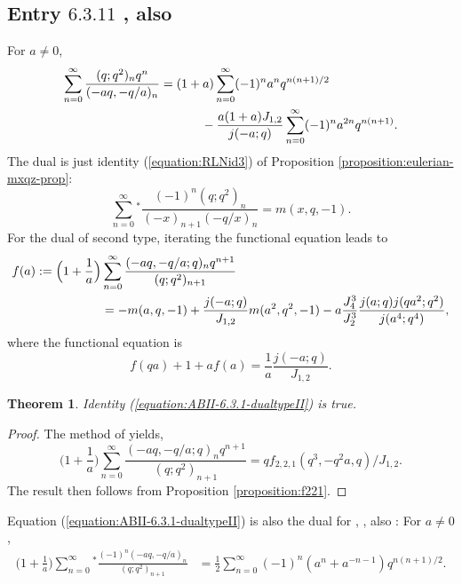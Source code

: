 \documentclass[12pt,reqno]{amsart}
\newtheorem{theorem}{Theorem}
\theoremstyle{remark}
\theoremstyle{definition}
\numberwithin{theorem}{section} \numberwithin{equation}{section}
\numberwithin{example}{section}
\begin{document}
{\subsection{Entry $6.3.11$ \cite{ABII}, also \cite[p. 4]{RLN}}
For $a\ne 0$,
\begin{align}
\sum_{n=0}^{\infty}\frac{(q;q^2)_{n}q^{n}}{(-aq,-q/a)_{n}}
&=(1+a)\sum_{n=0}^{\infty}(-1)^na^{n}q^{n(n+1)/2}\label{equation:ABII-6.3.11}\\
& \ \ \ \ \ \ \ \ \ \ -\frac{a(1+a)J_{1,2}}{j(-a;q)}\sum_{n=0}^{\infty}(-1)^na^{2n}q^{n(n+1)}.\notag
\end{align}
The dual is just identity (\ref{equation:RLNid3}) of  Proposition \ref{proposition:eulerian-mxqz-prop}:
\begin{equation*}
\sum_{n= 0}^{\infty}{}^*\frac{(-1)^n(q;q^2)_n}{(-x)_{n+1}(-q/x)_n}=m(x,q,-1).
\end{equation*}
For the dual of second type, iterating the functional equation leads to
{\allowdisplaybreaks \begin{align}
f(a):=\Big ( 1+\frac{1}{a}\Big )&\sum_{n=0}^{\infty}\frac{(-aq,-q/a;q)_nq^{n+1}}{(q;q^2)_{n+1}}\label{equation:ABII-6.3.1-dualtypeII}\\
&=-m(a,q,-1)+\frac{j(-a;q)}{J_{1,2}}m(a^2,q^2,-1) -a\frac{J_4^3}{J_2^3}\frac{j(a;q)j(qa^2;q^2)}{j(a^4;q^4)},\notag
\end{align}}where the functional equation is
\begin{equation*}
f(qa)+1+af(a)=\frac{1}{a}\frac{j(-a;q)}{{J}_{1,2}}.
\end{equation*}
\begin{theorem}
Identity (\ref{equation:ABII-6.3.1-dualtypeII}) is true.
\end{theorem}
\begin{proof}
The method of \cite{L} yields,
\begin{equation*}
\Big ( 1+\frac{1}{a}\Big )\sum_{n=0}^{\infty}\frac{(-aq,-q/a;q)_nq^{n+1}}{(q;q^2)_{n+1}}=qf_{2,2,1}(q^3,-q^2a,q)/J_{1,2}.
\end{equation*}
The result then follows from Proposition \ref{proposition:f221}.  
\end{proof}
Equation (\ref{equation:ABII-6.3.1-dualtypeII}) is also the dual for \cite[Entry $5.4.3$]{ABII}, \cite[Entry $6.4.6$]{ABII}, also \cite[p. 4]{RLN} :
For $a\ne0$,
\begin{align}
\Big ( 1+\frac{1}{a}\Big )\sum_{n=0}^{\infty}{}^*\frac{(-1)^n(-aq,-q/a)_n}{(q;q^2)_{n+1}}
&=\frac{1}{2}\sum_{n=0}^{\infty}(-1)^n (a^n+a^{-n-1})q^{n(n+1)/2}\label{equation:ABII-5.4.3}.
\end{align}

}
\end{document}

